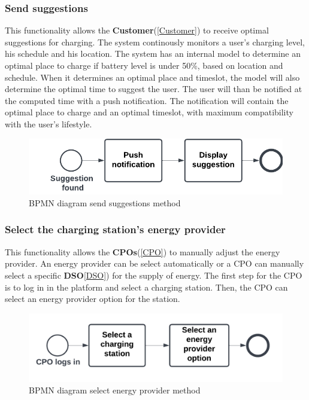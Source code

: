 \subsubsection{Send suggestions}
This functionality allows the \textbf{Customer}(\ref{Customer}) to receive optimal suggestions for charging.
The system continously monitors a user's charging level, his schedule and his location.
The system has an internal model to determine an optimal place to charge if battery level is under 50\%, based on location and schedule.
When it determines an optimal place and timeslot, the model will also determine the optimal time to suggest the user.
The user will than be notified at the computed time with a push notification. The notification will contain the optimal place to charge and an optimal timeslot, with maximum compatibility with the user's lifestyle. 
\begin{figure}[H]
    \begin{center}
        \includegraphics[width=\textwidth]{img/fun-sug.png}
        \caption{BPMN diagram send suggestions method}
    \end{center}
\end{figure}
\subsubsection{Select the charging station's energy provider}
This functionality allows the \textbf{CPOs}(\ref{CPO}) to manually adjust the energy provider. An energy provider can be select automatically or a CPO can manually select a specific \textbf{DSO}\ref{DSO}) for the supply of energy. The first step for the CPO is to log in in the platform and select a charging station. Then, the CPO can select an energy provider option for the station.
\begin{figure}[H]
    \begin{center}
        \includegraphics[width=\textwidth]{img/fun-en-prov.png}
        \caption{BPMN diagram select energy provider method}
    \end{center}
\end{figure}
